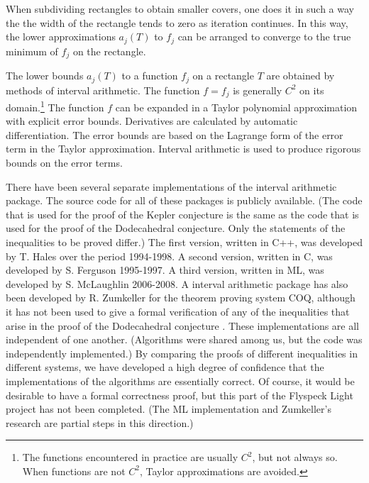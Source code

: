 When subdividing rectangles to obtain smaller covers, one does
it in such a way the the width of the rectangle tends to zero
as iteration continues.
In this way,  the lower approximations 
$a_j(T)$ to $f_j$ can be arranged to converge to the true minimum of $f_j$ on the
rectangle.

The lower bounds $a_j(T)$ to a function $f_j$ on a rectangle $T$
are obtained by methods of interval arithmetic.  The function
$f=f_j$ is generally $C^2$ on its domain.\footnote{The functions
 encountered in practice are usually $C^2$, but not always so.  When functions are not
$C^2$,  Taylor approximations are avoided.}  
The function $f$ can be expanded in a Taylor polynomial approximation with
explicit error bounds.  Derivatives are calculated by automatic
differentiation.  The error bounds are based on the Lagrange form of
the error term in the Taylor approximation.  Interval arithmetic is used to produce rigorous bounds on the error terms.


There have been several separate implementations of the interval
arithmetic package.  
The source code for all of these packages
is publicly available. (The code that is used for the proof of 
the Kepler conjecture is the same as the code that is used for
the proof of the Dodecahedral conjecture.  Only the statements
of the inequalities to be proved differ.) 
The first version, written in C++, 
was developed by T. Hales
over the period 1994-1998.  
A second version, written in C, was developed by S. Ferguson 
1995-1997.  A third version, written in ML, was developed by S. McLaughlin 2006-2008.  A interval arithmetic package has also been developed
by R. Zumkeller for the theorem proving system COQ, although it has not  been used to give a formal verification of any of the inequalities that arise in the proof of the Dodecahedral conjecture \cite{Zu}.
These implementations are all independent of one another. (Algorithms
were shared among us, but the code was independently implemented.) 
By comparing the proofs of different inequalities in different 
systems, we have developed 
a high degree of confidence that the implementations
of the algorithms are essentially correct.  Of course, it would
be desirable to have a formal correctness proof, but this part
of the Flyspeck Light project has not been completed.  (The ML
implementation and Zumkeller's research are partial steps
in this direction.)

